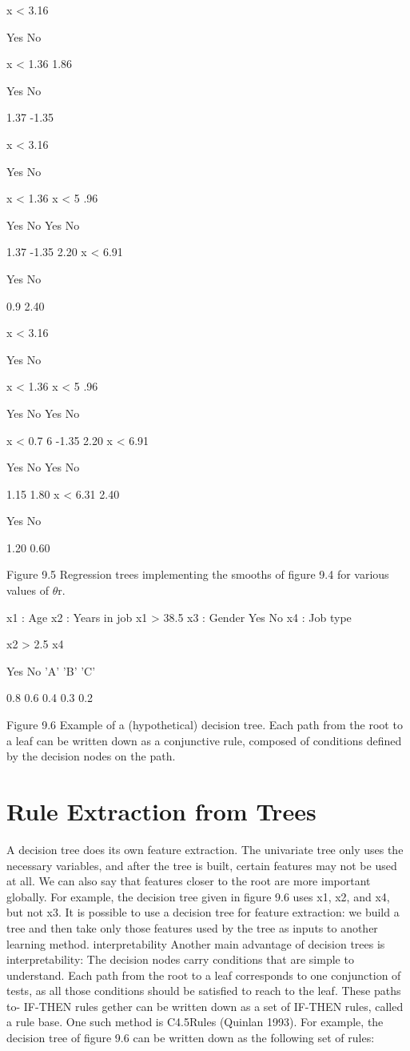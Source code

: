 x < 3.16

Yes No

x < 1.36 1.86

Yes No

1.37 -1.35

x < 3.16

Yes No

x < 1.36 x < 5 .96

Yes No Yes No

1.37 -1.35 2.20 x < 6.91

Yes No

0.9 2.40

x < 3.16

Yes No

x < 1.36 x < 5 .96

Yes No Yes No

x < 0.7 6 -1.35 2.20 x < 6.91

Yes No Yes No

1.15 1.80 x < 6.31 2.40

Yes No

1.20 0.60

Figure 9.5 Regression trees implementing the smooths of figure 9.4 for various values of $\theta$r.

x1 : Age x2 : Years in job x1 > 38.5 x3 : Gender Yes No x4 : Job type

x2 > 2.5 x4

Yes No 'A' 'B' 'C'

0.8 0.6 0.4 0.3 0.2

Figure 9.6 Example of a (hypothetical) decision tree. Each path from the root to a leaf can be written down as a conjunctive rule, composed of conditions defined by the decision nodes on the path.

\section{Rule Extraction from Trees}

A decision tree does its own feature extraction. The univariate tree only uses the necessary variables, and after the tree is built, certain features may not be used at all. We can also say that features closer to the root are more important globally. For example, the decision tree given in figure 9.6 uses x1, x2, and x4, but not x3. It is possible to use a decision tree for feature extraction: we build a tree and then take only those features used by the tree as inputs to another learning method. interpretability Another main advantage of decision trees is interpretability: The decision nodes carry conditions that are simple to understand. Each path from the root to a leaf corresponds to one conjunction of tests, as all those conditions should be satisfied to reach to the leaf. These paths to- IF-THEN rules gether can be written down as a set of IF-THEN rules, called a rule base. One such method is C4.5Rules (Quinlan 1993). For example, the decision tree of figure 9.6 can be written down as the following set of rules:

